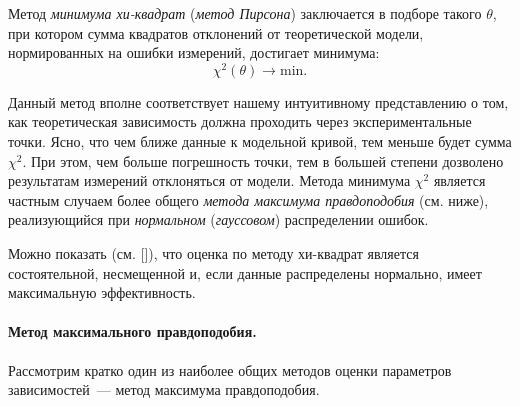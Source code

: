 Метод \emph{минимума хи-квадрат} (\emph{метод Пирсона}) заключается в подборе такого
$\theta$, при котором сумма квадратов отклонений от теоретической
модели, нормированных на ошибки измерений, достигает минимума:
\[
\chi^2(\theta) \to \mathrm{min}.
\]


Данный метод вполне соответствует нашему интуитивному представлению
о том, как теоретическая зависимость должна проходить через экспериментальные
точки. Ясно, что чем ближе данные к модельной кривой, тем
меньше будет сумма $\chi^2$. При этом, чем больше погрешность точки, тем
в большей степени дозволено результатам измерений отклоняться от модели.
Метода минимума $\chi^2$ является частным случаем
более общего \emph{метода максимума правдоподобия} (см. ниже),
реализующийся при \emph{нормальном} (\emph{гауссовом}) распределении ошибок.

Можно показать (см. []), что оценка по методу хи-квадрат является состоятельной,
несмещенной и, если данные распределены нормально,
имеет максимальную эффективность.




\paragraph{Метод максимального правдоподобия.} Рассмотрим кратко один
из наиболее общих методов оценки параметров зависимостей~---
метод максимума правдоподобия.

